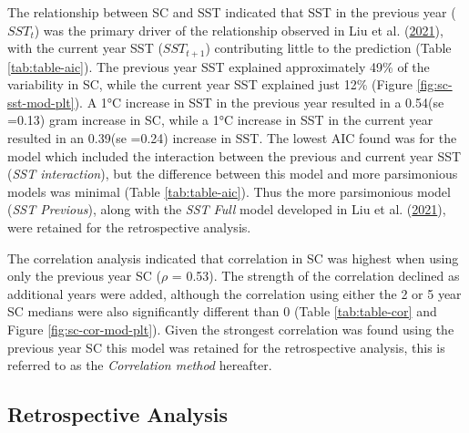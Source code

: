 \documentclass[
]{article}
\begin{document}
The relationship between SC and SST indicated that SST in the previous year (\(SST_{t}\)) was the primary driver of the relationship observed in Liu et al. (\protect\hyperlink{ref-liuUsingSatelliteRemote2021}{2021}), with the current year SST (\(SST_{t+1}\)) contributing little to the prediction (Table \ref{tab:table-aic}). The previous year SST explained approximately 49\% of the variability in SC, while the current year SST explained just 12\% (Figure \ref{fig:sc-sst-mod-plt}). A 1°C increase in SST in the previous year resulted in a 0.54(se =0.13) gram increase in SC, while a 1°C increase in SST in the current year resulted in an 0.39(se =0.24) increase in SST. The lowest AIC found was for the model which included the interaction between the previous and current year SST (\emph{SST interaction}), but the difference between this model and more parsimonious models was minimal (Table \ref{tab:table-aic}). Thus the more parsimonious model (\emph{SST Previous}), along with the \emph{SST Full} model developed in Liu et al. (\protect\hyperlink{ref-liuUsingSatelliteRemote2021}{2021}), were retained for the retrospective analysis.

The correlation analysis indicated that correlation in SC was highest when using only the previous year SC (\(\rho\) = 0.53). The strength of the correlation declined as additional years were added, although the correlation using either the 2 or 5 year SC medians were also significantly different than 0 (Table \ref{tab:table-cor} and Figure \ref{fig:sc-cor-mod-plt}). Given the strongest correlation was found using the previous year SC this model was retained for the retrospective analysis, this is referred to as the \emph{Correlation method} hereafter.

\hypertarget{retrospective-analysis}{%
\subsection{Retrospective Analysis}\label{retrospective-analysis}}
\end{document}
